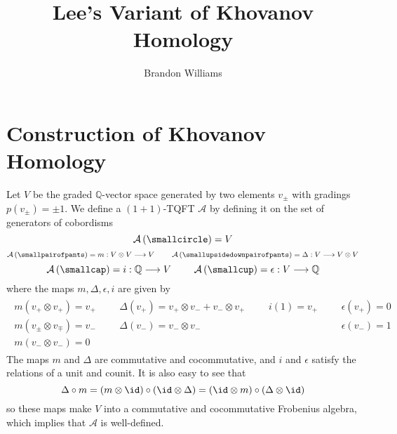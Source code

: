 











\title{\Large Lee's Variant of Khovanov Homology}
\author{\large Brandon Williams}

\maketitle



\section{Construction of Khovanov Homology}

Let $V$ be the graded $\mathbb Q$-vector space generated by two elements $v_\pm$ with gradings $p(v_\pm) = \pm 1$. We define a $(1+1)$-TQFT $\mathcal A$ by defining it on the set of generators of cobordisms
\[
\mathcal A \left( \smallcircle \right) = V
\]
\[
\mathcal A\left( \smallpairofpants \right) = m : V \otimes V \longrightarrow V  \ \ \ \ \ \ \ \mathcal A \left( \smallupsidedownpairofpants \right) = \Delta : V \longrightarrow V \otimes V 
\]
\[
\mathcal A \left( \smallcap \right) = i : \mathbb Q \longrightarrow V  \ \ \ \ \ \ \ \mathcal A \left( \smallcup \right) = \epsilon : V \longrightarrow \mathbb Q
\]
where the maps $m,\Delta,\epsilon,i$ are given by
\begin{align}
\label{mdei}
\begin{array}{lcclcclcclcc}
	m(v_+ \otimes v_+)     = v_+ & & & \Delta(v_+) = v_+ \otimes v_- + v_- \otimes v_+ & & &  i(1) = v_+ & & & \epsilon(v_+) = 0 \\
	m(v_\pm \otimes v_\mp) = v_- & & &  \Delta(v_-) = v_- \otimes v_-                  & & &             & & & \epsilon(v_-) = 1 \\
	m(v_- \otimes v_-)     = 0
\end{array}
\end{align}
The maps $m$ and $\Delta$ are commutative and cocommutative, and $i$ and $\epsilon$ satisfy the relations of a unit and counit. It is also easy to see that
\begin{equation}
\label{frobenius condition}
\Delta \circ m = (m \otimes \id) \circ (\id \otimes \Delta) = (\id \otimes m) \circ (\Delta \otimes \id)
\end{equation}
so these maps make $V$ into a commutative and cocommutative Frobenius algebra, which implies that $\mathcal A$ is well-defined.

